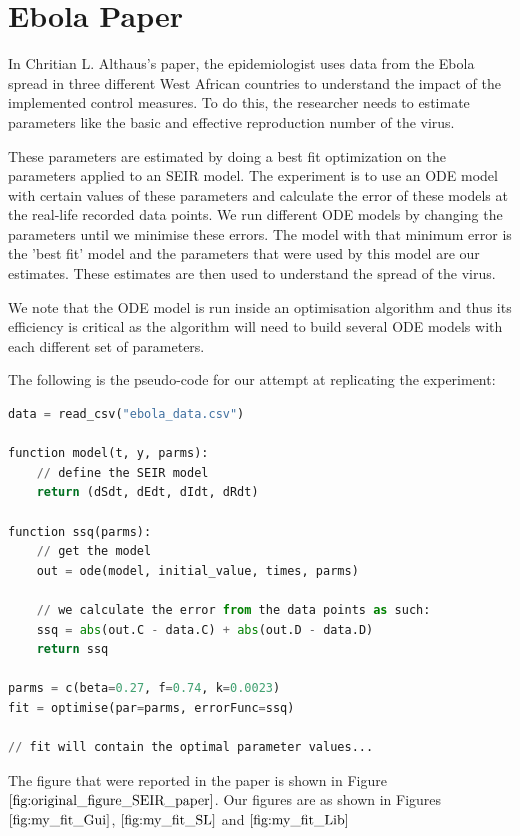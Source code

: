 
\section{Ebola Paper}
\label{section:ebola_paper}
In Chritian L. Althaus's paper, the epidemiologist uses data from the Ebola spread in three different West African countries to understand the impact of the implemented control measures. To do this, the researcher needs to estimate parameters like the basic and effective reproduction number of the virus.

These parameters are estimated by doing a best fit optimization on the parameters applied to an SEIR model. The experiment is to use an ODE model with certain values of these parameters and calculate the error of these models at the real-life recorded data points. We run different ODE models by changing the parameters until we minimise these errors. The model with that minimum error is the 'best fit' model and the parameters that were used by this model are our estimates. These estimates are then used to understand the spread of the virus. 

We note that the ODE model is run inside an optimisation algorithm and thus its efficiency is critical as the algorithm will need to build several ODE models with each different set of parameters.

The following is the pseudo-code for our attempt at replicating the experiment:

\begin{minipage}{\linewidth}
\begin{lstlisting}[language=Python]
data = read_csv("ebola_data.csv")

function model(t, y, parms):
    // define the SEIR model
    return (dSdt, dEdt, dIdt, dRdt)

function ssq(parms):
    // get the model
    out = ode(model, initial_value, times, parms)

    // we calculate the error from the data points as such:
    ssq = abs(out.C - data.C) + abs(out.D - data.D)
    return ssq

parms = c(beta=0.27, f=0.74, k=0.0023)
fit = optimise(par=parms, errorFunc=ssq)

// fit will contain the optimal parameter values...
\end{lstlisting}
\end{minipage}

The figure that were reported in the paper is shown in Figure $\ref{fig:original_figure_SEIR_paper}$. Our figures are as shown in Figures $\ref{fig:my_fit_Gui}$, $\ref{fig:my_fit_SL}$ and $\ref{fig:my_fit_Lib}$

